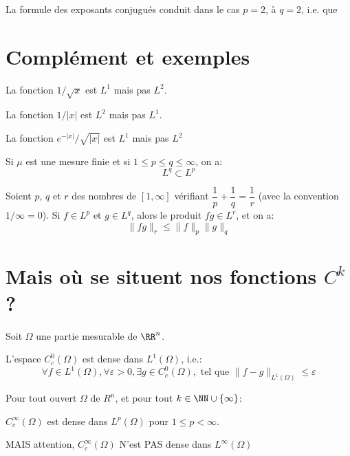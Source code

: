 \medskip
{}

\medskip
La formule des exposants conjugués conduit dans le cas $p=2$, à $q=2$, i.e.
que 

\medskip
\section{Complément et exemples}

\indent La fonction $1/\sqrt{x}$ est $L^1$ mais pas $L^2$.

La fonction $1/|x|$ est $L^2$ mais pas $L^1$.

La fonction $e^{-|x|}/\sqrt{|x|}$ est $L^1$ mais pas $L^2$

\medskip
\begin{theoreme}
Si $\mu$ est une mesure finie et si $1\le p\le q\le \infty$, on a:
\begin{equation}L^q\subset L^p\end{equation}
\end{theoreme}

\begin{theoreme}
Soient $p$, $q$ et $r$ des nombres de $[1,\infty]$ vérifiant
$\dfrac1p+\dfrac1q=\dfrac1r$ (avec la convention $1/\infty=0$).
Si $f\in L^p$ et $g\in L^q$, alors le produit $fg\in L^r$, et on a:
\begin{equation}\|fg\|_r\le\|f\|_p\|g\|_q\end{equation}
\end{theoreme}



\medskip
\section{Mais où se situent nos fonctions $C^k$?}

Soit $\Omega$ une partie mesurable de $\RR^n$.

L'espace $C_c^0(\Omega)$ est dense dans $L^1(\Omega)$, i.e.:
\begin{equation}
\forall f\in L^1(\Omega), \forall\varepsilon>0, \exists g\in C_ c^0(\Omega), \text{ tel que }
\|f-g\|_{L^1(\Omega)}\le\varepsilon
\end{equation}

\medskip
Pour tout ouvert $\Omega$ de $R^n$, et pour tout $k\in\NN\cup\{\infty\}$:

$C_c^\infty(\Omega)$ est dense dans $L^p(\Omega)$ pour $1\le p<\infty$.

MAIS attention, $C_c^\infty(\Omega)$ N'est PAS dense dans $L^\infty(\Omega)$
